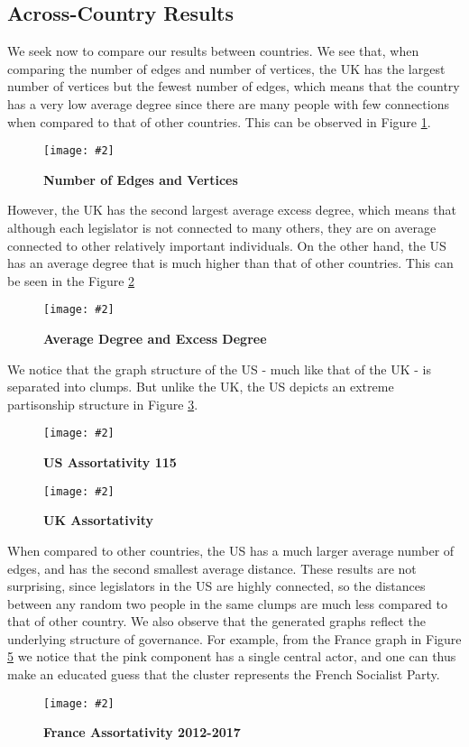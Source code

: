 \documentclass[12pt]{article}
\newcommand{\image}[4][0.6]{
  \begin{figure}[H]
    \centering
    \texttt{[image: \#2]}
    \begin{center}
      \caption[(details)]{\textbf{#4}\label{fig:#3}}
    \end{center}
    \vspace{-2.5em}
  \end{figure}}
\begin{document}
\begin{multicols*}{2}
\subsection{Across-Country Results}


We seek now to compare our results between countries. We see that, when comparing the number of edges and number of vertices, the UK has the largest number of vertices but the fewest number of edges, which means that the country has a very low average degree since there are many people with few connections when compared to that of other countries. This can be observed in Figure \ref{fig:edge-vert}.
\image[0.26]{../plots/across-country/Number of EdgesNumber of Vertices}{edge-vert}{Number of Edges and Vertices}
However, the UK has the second largest average excess degree, which means that although each legislator is not connected to many others, they are on average connected to other relatively important individuals. On the other hand, the US has an average degree that is much higher than that of other countries. This can be seen in the Figure \ref{fig:degree-excess}
\image[0.26]{../plots/across-country/Average DegreeAverage Excess Degree.pdf}{degree-excess}{Average Degree and Excess Degree}
We notice that the graph structure of the US - much like that of the UK - is separated into clumps. But unlike the UK, the US depicts an extreme partisonship structure in Figure \ref{fig:us_ass}.

\image[0.3]{../plots/graph/US/assortativity/assortativity_us.115.pdf}{us_ass}{US Assortativity 115}
\image[0.3]{../plots/graph/UK/assortativity/assortativity_uk.pdf}{uk_ass}{UK Assortativity}

When compared to other countries, the US has a much larger average number of edges, and has the second smallest average distance. These results are not surprising, since legislators in the US are highly connected, so the distances between any random two people in the same clumps are much less compared to that of other country. We also observe that the generated graphs reflect the underlying structure of governance. For example, from the France graph in Figure \ref{fig:fr_assortativity} we notice that the pink component has a single central actor, and one can thus make an educated guess that the cluster represents the French Socialist Party. 

\image[0.3]{../plots/graph/france/assortativity/assortativity_net_fr_an2012-2017.pdf}{fr_assortativity}{France Assortativity 2012-2017}


\end{multicols*}
\end{document}
